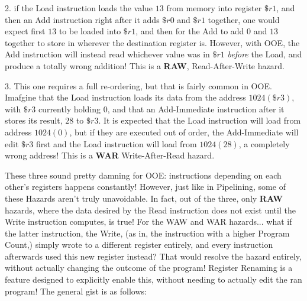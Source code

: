 \documentclass[12pt,twoside]{reedthesis}
\begin{document}
2. if the Load instruction loads the value $13$ from memory into register $\$r1$, and then an Add instruction right after it adds $\$r0$ and $\$r1$ together, one would expect first $13$ to be loaded into $\$r1$, and then for the Add to add $0$ and $13$ together to store in wherever the destination register is. However, with OOE, the Add instruction will instead read whichever value was in $\$r1$ \textit{before} the Load, and produce a totally wrong addition! This is a \textbf{RAW}, Read-After-Write hazard.

3. This one requires a full re-ordering, but that is fairly common in OOE. Imafgine that the Load instruction loads its data from the address $1024(\$r3)$, with $\$r3$ currently holding 0, and that an Add-Immediate instruction after it stores its result,  $28$ to $\$r3$. It is expected that the Load instruction will load from address $1024(0)$, but if they are executed out of order, the Add-Immediate will edit $\$r3$ first and the Load instruction will load from $1024(28)$, a completely wrong address! This is a \textbf{WAR} Write-After-Read hazard.

These three sound pretty damning for OOE: instructions depending on each other's registers happens constantly! However, just like in Pipelining, some of these Hazards aren't truly unavoidable. In fact, out of the three, only \textbf{RAW} hazards, where the data desired by the Read instruction does not exist until the Write instruction computes, is true! For the WAW and WAR hazards... what if the latter instruction, the Write, (as in, the instruction with a higher Program Count,) simply wrote to a different register entirely, and every instruction afterwards used this new register instead? That would resolve the hazard entirely, without actually changing the outcome of the program! Register Renaming is a feature designed to explicitly enable this, without needing to actually edit the ran program! The general gist is as follows:
\end{document}
